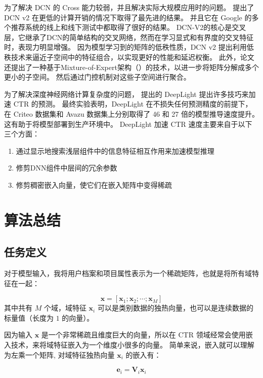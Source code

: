 \documentclass[degree=project,degree-type=project,cjk-font=noto]{thuthesis}
\begin{document}
为了解决 DCN 的 Cross 能力较弱，并且解决实际大规模应用时的问题。
\cite{dcn_v2} 提出了 DCN v2 在更低的计算开销的情况下取得了最先进的结果。
并且它在 Google 的多个推荐系统的线上和线下测试中都取得了很好的结果。
DCN-V2的核心是交叉层，它继承了DCN的简单结构的交叉网络，然而在学习显式和有界度的交叉特征时，表现力明显增强。
因为模型学习到的矩阵的低秩性质，DCN v2 提出利用低秩技术来逼近子空间中的特征组合，以实现更好的性能和延迟权衡。
此外，论文还提出了一种基于Mixture-of-Expert架构（\cite{mix_experts}）的技术，以进一步将矩阵分解成多个更小的子空间。
然后通过门控机制对这些子空间进行聚合。


为了解决深度神经网络计算复杂度的问题，\cite{deeplightd} 提出的 DeepLight 提出许多技巧来加速 CTR 的预测。
最终实验表明，DeepLight 在不损失任何预测精度的前提下，在 Criteo 数据集和 Avazu 数据集上分别取得了 46 和 27 倍的模型推导速度提升。
这有助于将模型部署到生产环境中。
DeepLight 加速 CTR 速度主要来自于以下三个方面：

\begin{enumerate}
  \item 通过显示地搜索浅层组件中的信息特征相互作用来加速模型推理
  \item 修剪DNN组件中层间的冗余参数
  \item 修剪稠密嵌入向量，使它们在嵌入矩阵中变得稀疏
\end{enumerate}


\chapter{算法总结}

\section{任务定义}

对于模型输入，我将用户档案和项目属性表示为一个稀疏矩阵，也就是将所有域特征在一起：

\begin{equation}
  \symbf{x} = [\symbf{x}_1; \symbf{x}_2; \cdots; \symbf{x}_M]
\end{equation}
其中共有 $M$ 个域，域特征 $\symbf{x}_i$ 可以是类别数据的独热向量，也可以是连续数据的标量值（长度为 $1$ 的向量）。

因为输入 $\bm{x}$ 是一个非常稀疏且维度巨大的向量，所以在 CTR 领域经常会使用嵌入技术，来将域特征嵌入为一个维度小很多的向量。
简单来说，嵌入就可以理解为左乘一个矩阵, 对域特征独热向量 $\bm{x}_i$ 的嵌入有：

\begin{equation}
  \bm{e}_i = \bm{V}_i \bm{x}_i
\end{equation}
\end{document}
